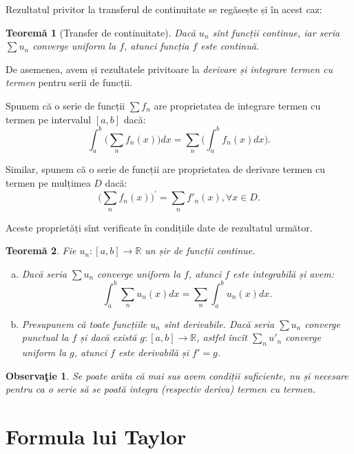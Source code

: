 \documentclass[11pt,a4paper]{article}
\newcommand\RR{\mathbb{R}}
\theoremstyle{dotless}
\newtheorem{theorem}{Teorem\u{a}}[section]
\theoremstyle{dotlessdr}
\newtheorem{remark}{Observa\c{t}ie}[section]
\begin{document}
Rezultatul privitor la transferul de continuitate se regăsește și în acest caz:

\begin{theorem}[Transfer de continuitate]\label{thm:transfer-cont}
  Dacă $u_n$ sînt funcții continue, iar seria $\sum u_n$ converge uniform la $f$, atunci
  funcția $f$ este continuă.
\end{theorem}

De asemenea, avem și rezultatele privitoare la \emph{derivare și integrare termen cu termen}
pentru serii de funcții.

Spunem că o serie de funcții $\sum f_n$ are proprietatea de integrare termen cu termen pe
intervalul $[a, b]$ dacă:
\[
  \int_a^b \Big( \sum_n f_n(x) \Big) dx = \sum_n \Big( \int_a^b f_n(x) dx \Big).
\]

Similar, spunem că o serie de funcții are proprietatea de derivare termen cu termen
pe mulțimea $D$ dacă:
\[
  \Big( \sum_n f_n(x) \Big)^\prime = \sum_n f'_n(x), \forall x \in D.
\]

Aceste proprietăți sînt verificate în condițiile date de rezultatul următor.

\begin{theorem}\label{thm:der-int-ter}
  Fie $u_n : [a, b] \to \RR$ un șir de funcții continue.
  \begin{enumerate}[(a)]
  \item Dacă seria $\sum u_n$ converge uniform la $f$, atunci $f$ este integrabilă și avem:
    \[
      \int_a^b \sum_n u_n(x) dx = \sum_n \int_a^b u_n(x) dx.
    \]
  \item Presupunem că toate funcțiile $u_n$ sînt derivabile. Dacă seria $\sum u_n$ converge
    punctual la $f$ și dacă există $g : [a, b] \to \RR$, astfel încît $\sum_n u'_n$ converge
    uniform la $g$, atunci $f$ este derivabilă și $f' = g$.
  \end{enumerate}
\end{theorem}

\begin{remark}\label{rk:der-int-suf}
  Se poate arăta că mai sus avem condiții \emph{suficiente}, nu și necesare pentru ca o serie să
  se poată integra (respectiv deriva) termen cu termen.
\end{remark}


\section{Formula lui Taylor}
\label{sec:taylor}
\end{document}
